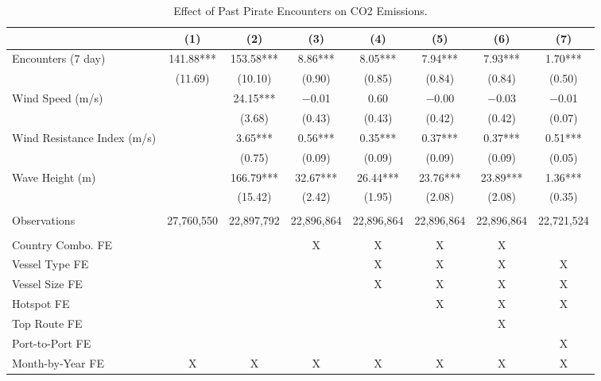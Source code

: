 \begin{table}
\centering
\caption{Effect of Past Pirate Encounters on CO2 Emissions. \label{tab:spec-co2-table-rev}}
\centering
\begin{adjustbox}{width = .9\textwidth}
\begin{threeparttable}
\begin{tabular}[t]{lccccccc}
\toprule
  & (1) & (2) & (3) & (4) & (5) & (6) & (7)\\
\midrule
Encounters (7 day) & \num{141.88}*** & \num{153.58}*** & \num{8.86}*** & \num{8.05}*** & \num{7.94}*** & \num{7.93}*** & \num{1.70}***\\
 & (\num{11.69}) & (\num{10.10}) & (\num{0.90}) & (\num{0.85}) & (\num{0.84}) & (\num{0.84}) & (\num{0.50})\\
Wind Speed (m/s) &  & \num{24.15}*** & \num{-0.01} & \num{0.60} & \num{-0.00} & \num{-0.03} & \num{-0.01}\\
 &  & (\num{3.68}) & (\num{0.43}) & (\num{0.43}) & (\num{0.42}) & (\num{0.42}) & (\num{0.07})\\
Wind Resistance Index (m/s) &  & \num{3.65}*** & \num{0.56}*** & \num{0.35}*** & \num{0.37}*** & \num{0.37}*** & \num{0.51}***\\
 &  & (\num{0.75}) & (\num{0.09}) & (\num{0.09}) & (\num{0.09}) & (\num{0.09}) & (\num{0.05})\\
Wave Height (m) &  & \num{166.79}*** & \num{32.67}*** & \num{26.44}*** & \num{23.76}*** & \num{23.89}*** & \num{1.36}***\\
 &  & (\num{15.42}) & (\num{2.42}) & (\num{1.95}) & (\num{2.08}) & (\num{2.08}) & (\num{0.35})\\
 &  &  &  &  &  &  & \\
Observations & 27,760,550 & 22,897,792 & 22,896,864 & 22,896,864 & 22,896,864 & 22,896,864 & 22,721,524\\
 &  &  &  &  &  &  & \\
Country Combo. FE &  &  & X & X & X & X & \\
Vessel Type FE &  &  &  & X & X & X & X\\
Vessel Size FE &  &  &  & X & X & X & X\\
Hotspot FE &  &  &  &  & X & X & X\\
Top Route FE &  &  &  &  &  & X & \\
Port-to-Port FE &  &  &  &  &  &  & X\\
Month-by-Year FE & X & X & X & X & X & X & X\\
\bottomrule
\end{tabular}

\end{threeparttable}
\end{adjustbox}
\end{table}
